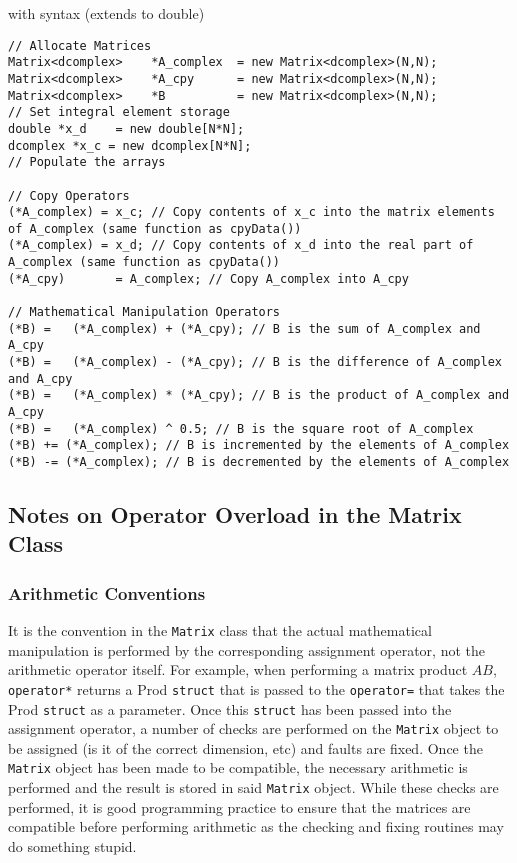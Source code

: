 \documentclass[english,journal=jctcce,manuscript=article,etalmode=truncate,maxauthors=0]{article}
\begin{document}
with syntax (extends to double)
\begin{lstlisting}
// Allocate Matrices
Matrix<dcomplex>    *A_complex  = new Matrix<dcomplex>(N,N); 
Matrix<dcomplex>    *A_cpy      = new Matrix<dcomplex>(N,N);
Matrix<dcomplex>    *B          = new Matrix<dcomplex>(N,N);
// Set integral element storage
double *x_d    = new double[N*N];
dcomplex *x_c = new dcomplex[N*N];
// Populate the arrays

// Copy Operators
(*A_complex) = x_c; // Copy contents of x_c into the matrix elements of A_complex (same function as cpyData())
(*A_complex) = x_d; // Copy contents of x_d into the real part of A_complex (same function as cpyData())
(*A_cpy)       = A_complex; // Copy A_complex into A_cpy

// Mathematical Manipulation Operators
(*B) =   (*A_complex) + (*A_cpy); // B is the sum of A_complex and A_cpy
(*B) =   (*A_complex) - (*A_cpy); // B is the difference of A_complex and A_cpy
(*B) =   (*A_complex) * (*A_cpy); // B is the product of A_complex and A_cpy
(*B) =   (*A_complex) ^ 0.5; // B is the square root of A_complex
(*B) += (*A_complex); // B is incremented by the elements of A_complex
(*B) -= (*A_complex); // B is decremented by the elements of A_complex
\end{lstlisting}

\subsection{Notes on Operator Overload in the Matrix Class}
\subsubsection{Arithmetic Conventions}
It is the convention in the \texttt{Matrix} class that the actual mathematical manipulation is performed by the corresponding assignment operator, not the arithmetic operator itself. For example, when performing a matrix product $AB$, \texttt{operator*} returns a Prod \texttt{struct} that is passed to the \texttt{operator=} that takes the Prod \texttt{struct} as a parameter. Once this \texttt{struct} has been passed into the assignment operator, a number of checks are performed on the \texttt{Matrix} object to be assigned (is it of the correct dimension, etc) and faults are fixed. Once the \texttt{Matrix} object has been made to be compatible, the necessary arithmetic is performed and the result is stored in said \texttt{Matrix} object. While these checks are performed, it is good programming practice to ensure that the matrices are compatible before performing arithmetic as the checking and fixing routines may do something stupid.
\end{document}
